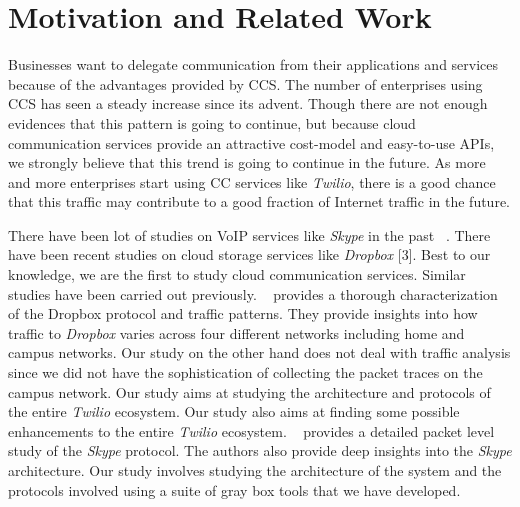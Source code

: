 \section{Motivation and Related Work}
\label{sec-motivationandrelated}
Businesses want to delegate communication from their applications and services because of the advantages provided by CCS. The number of enterprises using CCS has seen a steady increase since its advent. Though there are not enough evidences that this pattern is going to continue, but because cloud communication services provide an attractive cost-model and easy-to-use APIs, we strongly believe that this trend is going to continue in the future. As more and more enterprises start using CC services like \textit{Twilio}, there is a good chance that this traffic may contribute to a good fraction of Internet traffic in the future. \par
There have been lot of studies on VoIP services like \textit{Skype} in the past ~\cite{Baset04ananalysis}. There have been recent studies on cloud storage services like \textit{Dropbox} [3]. Best to our knowledge, we are the first to study cloud communication services. Similar studies have been carried out previously. ~\cite{Drago:2012:IDU:2398776.2398827} provides a thorough characterization of the Dropbox protocol and traffic patterns. They provide insights into how traffic to \textit{Dropbox} varies across four different networks including home and campus networks. Our study on the other hand does not deal with traffic analysis since we did not have the sophistication of collecting the packet traces on the campus network. Our study aims at studying the architecture and protocols of the entire \textit{Twilio} ecosystem. Our study also aims at finding some possible enhancements to the entire \textit{Twilio} ecosystem. ~\cite{Baset04ananalysis} provides a detailed packet level study of the \textit{Skype} protocol. The authors also provide deep insights into the \textit{Skype} architecture. Our study involves studying the architecture of the system and the protocols involved using a suite of gray box tools that we have developed. \par